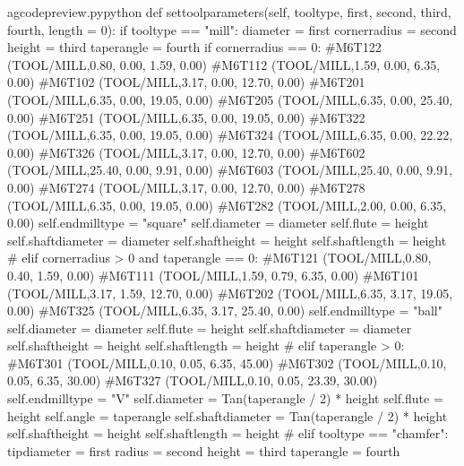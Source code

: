 \documentclass{ltxdoc}
\begin{document}
\lstset{firstnumber=\thegcpy}
\begin{writecode}{a}{gcodepreview.py}{python}
    def settoolparameters(self, tooltype, first, second, third, fourth, length = 0):
        if tooltype == "mill":
            diameter = first
            cornerradius = second
            height = third
            taperangle = fourth
            if cornerradius == 0:
#M6T122 (TOOL/MILL,0.80, 0.00, 1.59, 0.00)
#M6T112 (TOOL/MILL,1.59, 0.00, 6.35, 0.00)
#M6T102 (TOOL/MILL,3.17, 0.00, 12.70, 0.00)
#M6T201 (TOOL/MILL,6.35, 0.00, 19.05, 0.00)
#M6T205 (TOOL/MILL,6.35, 0.00, 25.40, 0.00)
#M6T251 (TOOL/MILL,6.35, 0.00, 19.05, 0.00)
#M6T322 (TOOL/MILL,6.35, 0.00, 19.05, 0.00)
#M6T324 (TOOL/MILL,6.35, 0.00, 22.22, 0.00)
#M6T326 (TOOL/MILL,3.17, 0.00, 12.70, 0.00)
#M6T602 (TOOL/MILL,25.40, 0.00, 9.91, 0.00)
#M6T603 (TOOL/MILL,25.40, 0.00, 9.91, 0.00)
#M6T274 (TOOL/MILL,3.17, 0.00, 12.70, 0.00)
#M6T278 (TOOL/MILL,6.35, 0.00, 19.05, 0.00)
#M6T282 (TOOL/MILL,2.00, 0.00, 6.35, 0.00)
                self.endmilltype = "square"
                self.diameter = diameter
                self.flute = height
                self.shaftdiameter = diameter
                self.shaftheight = height
                self.shaftlength = height
#
            elif cornerradius > 0 and taperangle == 0:
#M6T121 (TOOL/MILL,0.80, 0.40, 1.59, 0.00)
#M6T111 (TOOL/MILL,1.59, 0.79, 6.35, 0.00)
#M6T101 (TOOL/MILL,3.17, 1.59, 12.70, 0.00)
#M6T202 (TOOL/MILL,6.35, 3.17, 19.05, 0.00)
#M6T325 (TOOL/MILL,6.35, 3.17, 25.40, 0.00)
                self.endmilltype = "ball"
                self.diameter = diameter
                self.flute = height
                self.shaftdiameter = diameter
                self.shaftheight = height
                self.shaftlength = height
#
            elif taperangle > 0:
#M6T301 (TOOL/MILL,0.10, 0.05, 6.35, 45.00)
#M6T302 (TOOL/MILL,0.10, 0.05, 6.35, 30.00)
#M6T327 (TOOL/MILL,0.10, 0.05, 23.39, 30.00)
                self.endmilltype = "V"
                self.diameter = Tan(taperangle / 2) * height
                self.flute = height
                self.angle = taperangle
                self.shaftdiameter = Tan(taperangle / 2) * height 
                self.shaftheight = height
                self.shaftlength = height
#
        elif tooltype == "chamfer":
            tipdiameter = first
            radius = second
            height = third
            taperangle = fourth

\end{writecode}
\addtocounter{gcpy}{59}

\end{document}

